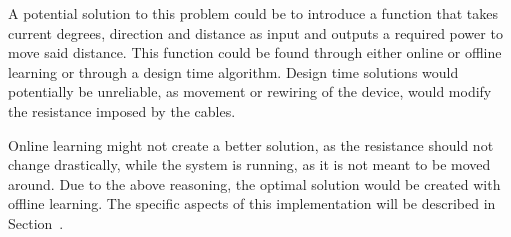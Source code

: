 A potential solution to this problem could be to introduce a function that takes current degrees, direction and distance as input and outputs a required power to move said distance.
This function could be found through either online or offline learning or through a design time algorithm.
Design time solutions would potentially be unreliable, as movement or rewiring of the device, would modify the resistance imposed by the cables.

Online learning might not create a better solution, as the resistance should not change drastically, while the system is running, as it is not meant to be moved around.
Due to the above reasoning, the optimal solution would be created with offline learning.
The specific aspects of this implementation will be described in Section~.
